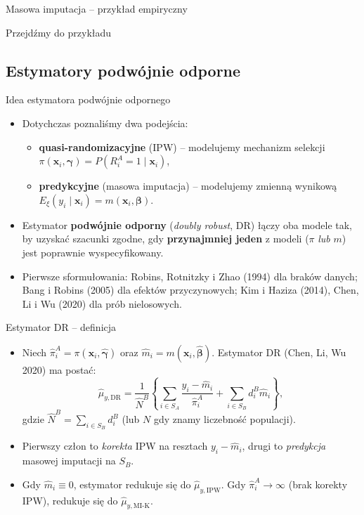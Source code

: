 \documentclass[10pt,ignorenonframetext, aspectratio=169]{beamer}
\newcommand{\bx}{\boldsymbol{x}}
\newcommand{\bbeta}{\boldsymbol{\beta}}
\newcommand{\bgamma}{\boldsymbol{\gamma}}
\begin{document}
\begin{frame}{Masowa imputacja -- przykład empiryczny}
\begin{center}
Przejdźmy do przykładu
\end{center}
\end{frame}

\subsection{Estymatory podwójnie odporne}

\begin{frame}{Idea estymatora podwójnie odpornego}
\begin{itemize}
\justifying
    \item Dotychczas poznaliśmy dwa podejścia:
    \begin{itemize}
        \item \textbf{quasi-randomizacyjne} (IPW) -- modelujemy mechanizm selekcji $\pi(\bx_i, \bgamma) = P(R_i^A=1\mid \bx_i)$,
        \item \textbf{predykcyjne} (masowa imputacja) -- modelujemy zmienną wynikową $E_{\xi}(y_i \mid \bx_i) = m(\bx_i, \bbeta)$.
    \end{itemize}
    \item Estymator \textbf{podwójnie odporny} (\textit{doubly robust}, DR) łączy oba modele tak, by uzyskać szacunki zgodne, gdy \textbf{przynajmniej jeden} z modeli ($\pi$ \emph{lub} $m$) jest poprawnie wyspecyfikowany.
    \item Pierwsze sformułowania: Robins, Rotnitzky i Zhao (1994) dla braków danych; Bang i Robins (2005) dla efektów przyczynowych; Kim i Haziza (2014), Chen, Li i Wu (2020) dla prób nielosowych.
\end{itemize}
\end{frame}

\begin{frame}{Estymator DR -- definicja}
\begin{itemize}
\justifying
    \item Niech $\hat{\pi}_i^A=\pi(\bx_i, \hat{\bgamma})$ oraz $\hat{m}_i = m(\bx_i, \hat{\bbeta})$. Estymator DR (Chen, Li, Wu 2020) ma postać:
    \begin{equation}
        \hat{\mu}_{y,\text{DR}} = \frac{1}{\hat{N}^B}\left\{ \sum_{i \in S_A} \frac{y_i - \hat{m}_i}{\hat{\pi}_i^A} + \sum_{i \in S_B} d_i^B \hat{m}_i \right\},
    \end{equation}
    gdzie $\hat{N}^B = \sum_{i \in S_B} d_i^B$ (lub $N$ gdy znamy liczebność populacji).
    \item Pierwszy człon to \emph{korekta} IPW na resztach $y_i - \hat{m}_i$, drugi to \emph{predykcja} masowej imputacji na $S_B$.
    \item Gdy $\hat{m}_i \equiv 0$, estymator redukuje się do $\hat{\mu}_{y,\text{IPW}}$. Gdy $\hat{\pi}_i^A \to \infty$ (brak korekty IPW), redukuje się do $\hat{\mu}_{y,\text{MI-K}}$.
\end{itemize}
\end{frame}
\end{document}
